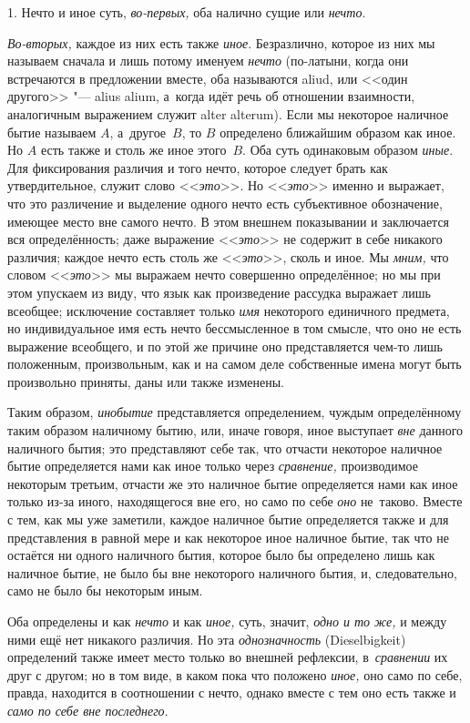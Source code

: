 1. Нечто и иное суть, {\em во-первых,} оба налично сущие или {\em нечто}.

{\em Во-вторых,} каждое из них есть также {\em иное}. Безразлично, которое из
них мы называем сначала и лишь потому именуем {\em нечто} (по-латыни, когда они
встречаются в предложении вместе, оба называются aliud, или <<один другого>>
"--- alius alium, а~когда идёт речь об отношении взаимности, аналогичным
выражением служит alter alterum). Если мы некоторое наличное бытие называем
$A$, а~другое~$B$, то $B$ определено ближайшим образом как иное. Но $A$ есть
также и столь же иное этого~$B$. Оба суть одинаковым образом {\em иные}. Для
фиксирования различия и того нечто, которое следует брать как утвердительное,
служит слово <<{\em это}>>. Но <<{\em это}>> именно и выражает, что это
различение и выделение одного нечто есть субъективное обозначение, имеющее
место вне самого нечто. В этом внешнем показывании и заключается вся
определённость; даже выражение <<{\em это}>> не содержит в себе никакого
различия; каждое нечто есть столь же <<{\em это}>>, сколь и иное. Мы
{\em мним,} что словом <<{\em это}>> мы выражаем нечто совершенно определённое;
но мы при этом упускаем из виду, что язык как произведение рассудка выражает
лишь всеобщее; исключение составляет только {\em имя} некоторого единичного
предмета, но индивидуальное имя есть нечто бессмысленное в том смысле, что оно
не есть выражение всеобщего, и по этой же причине оно представляется чем-то
лишь положенным, произвольным, как и на самом деле собственные имена могут быть
произвольно приняты, даны или также изменены.

Таким образом, {\em инобытие} представляется определением, чуждым определённому
таким образом наличному бытию, или, иначе говоря, иное выступает {\em вне}
данного наличного бытия; это представляют себе так, что отчасти некоторое
наличное бытие определяется нами как иное только через {\em сравнение,}
производимое некоторым третьим, отчасти же это наличное бытие определяется нами
как иное только из-за иного, находящегося вне его, но само по себе {\em оно}
не~таково. Вместе с тем, как мы уже заметили, каждое наличное бытие
определяется также и для представления в равной мере и как некоторое иное
наличное бытие, так что не остаётся ни одного наличного бытия, которое было бы
определено лишь как наличное бытие, не было бы вне некоторого наличного бытия,
и, следовательно, само не было бы некоторым иным.

Оба определены и как {\em нечто} и как {\em иное,} суть, значит,
{\em одно и то же,} и между ними ещё нет никакого различия. Но эта
{\em однозначность} (Diesel\-bigkeit) определений также имеет место только во
внешней рефлексии, в~{\em сравнении} их друг с другом; но в том виде, в каком
пока что положено {\em иное,} оно само по себе, правда, находится в соотношении
с нечто, однако вместе с тем оно есть также и
{\em само по себе вне последнего}.

